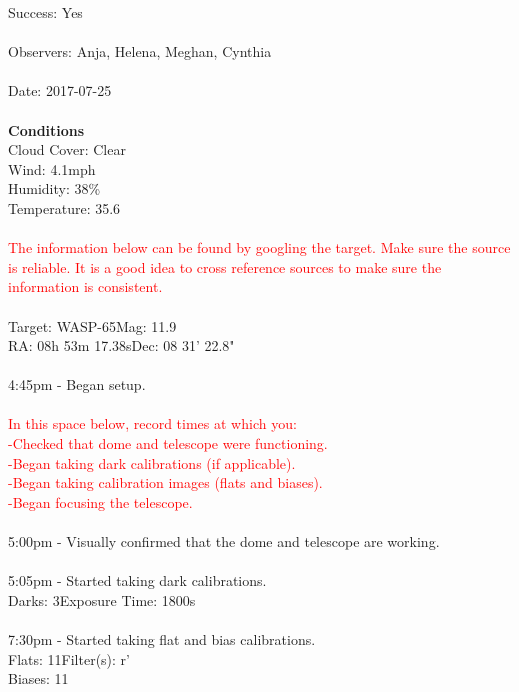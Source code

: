 \documentclass[11pt]{report}
\begin{document}
Success: Yes \\ \\
Observers: Anja, Helena, Meghan,  Cynthia \\ \\
Date: 2017-07-25 \\ \\
{\bf Conditions \\}
Cloud Cover: Clear \\
Wind: 4.1mph \\
Humidity: 38\% \\
Temperature: 35.6 \\ \\
\textcolor{red}{The information below can be found by googling the target. Make sure the source is reliable. It is a good idea to cross reference sources to make sure the information is consistent.} \\ \\
Target: WASP-65\hspace{75pt}Mag: 11.9 \\
RA: 08h 53m 17.38s\hspace{64pt}Dec: 08\degree{} 31' 22.8" \\ \\
4:45pm - Began setup. \\ \\
\textcolor{red}{In this space below, record times at which you: \\
-Checked that dome and telescope were functioning. \\
-Began taking dark calibrations (if applicable). \\
-Began taking calibration images (flats and biases). \\
-Began focusing the telescope.} \\ \\
5:00pm - Visually confirmed that the dome and telescope are working. \\ \\
5:05pm - Started taking dark calibrations. \\
Darks: 3\hspace{72pt}Exposure Time:  1800s \\ \\
7:30pm - Started taking flat and bias calibrations. \\
Flats: 11\hspace{72pt}Filter(s): r' \\
Biases: 11 \\ \\
\end{document}
